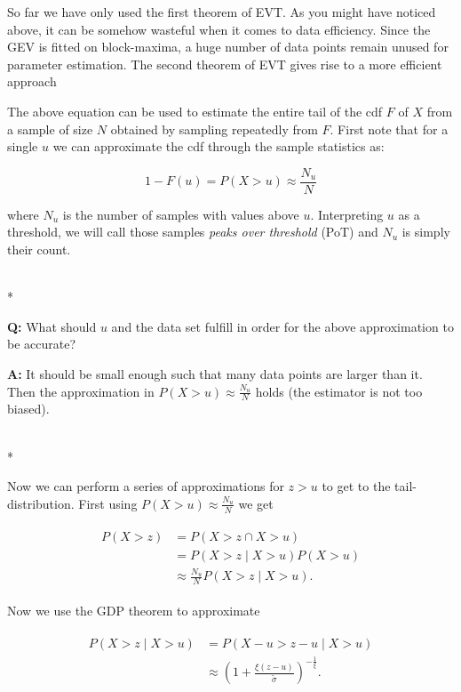 So far we have only used the first theorem of EVT. As you might have noticed
above, it can be somehow wasteful when it comes to data efficiency. Since the
GEV is fitted on block-maxima, a huge number of data points remain unused for
parameter estimation. The second theorem of EVT gives rise to a more efficient
approach

The above equation can be used to estimate the entire tail of the cdf $F$ of $X$
from a sample of size $N$ obtained by sampling repeatedly from $F$. First note
that for a single $u$ we can approximate the cdf through the sample statistics
as:


\begin{equation}
1-F(u) = P(X>u) \approx \frac{N_u}{N}
\end{equation}


where $N_u$ is the number of samples with values above $u$. Interpreting $u$ as
a threshold, we will call those samples \textit{peaks over threshold} (PoT) and
$N_u$ is simply their count.

\hrulefill\\*

\textbf{Q:} What should $u$ and the data set fulfill in order for the above
approximation to be accurate?

\textbf{A:} It should be small enough such that many data points are larger than it.
Then the approximation in $P(X>u) \approx \frac{N_u}{N}$ holds (the estimator is
not too biased). 

\hrulefill\\*

Now we can perform a series of approximations for $z>u$ to get to the
tail-distribution. First using $P(X>u) \approx \frac{N_u}{N}$ we get


\begin{align}
    \begin{split}
        P(X>z) &= P(X>z \cap X>u)  \\
        &= P(X>z \mid X>u) P(X>u)  \\
        &\approx \frac{N_u}{N} P(X>z \mid X>u).   
    \end{split}
\end{align}


Now we use the GDP theorem to approximate


\begin{align}
    \begin{split}
        P(X>z \mid X>u) &= P(X-u > z -u \mid X>u)  \\ 
        &\approx \left( 1 + \frac{\xi (z-u)}{\tilde{\sigma}} \right)^{-\frac{1}{\xi}}.
    \end{split}
\end{align}


